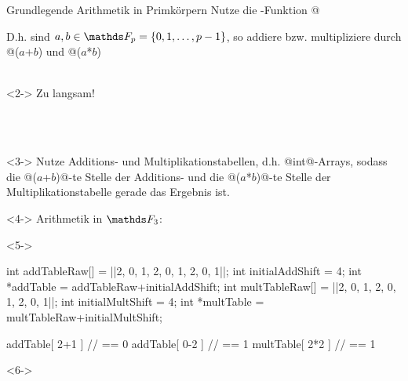 \documentclass{vorlage}
\begin{document}
\begin{frame}[fragile]{Grundlegende Arithmetik in Primkörpern}
   Nutze die \Clang-Funktion @%

  D.h. sind $a,b \in \F_p=\{0,1,\ldots,p-1\}$, so addiere bzw. multipliziere durch
  @($a$+$b$) %
  und 
  @($a$*$b$) %
  \\~\\

  \begin{uncoverenv}<2->
   Zu langsam!
  \end{uncoverenv}
  \\~\\
  \begin{uncoverenv}<3->
   Nutze Additions- und Multiplikationstabellen, d.h.
    @int@-Arrays, sodass die @($a$+$b$)@-te Stelle der Additions- und die 
    @($a$*$b$)@-te Stelle der Multiplikationstabelle gerade das Ergebnis ist.
  \end{uncoverenv}
  \begin{beispiel}<4->
    Arithmetik in $\F_3$:

    \begin{minipage}{0.65\textwidth}
    \begin{uncoverenv}<5->
    \begin{cexample}
int addTableRaw[] = ||{2, 0, 1, 2, 0, 1, 2, 0, 1}||;
int initialAddShift = 4;
int *addTable = addTableRaw+initialAddShift;
int multTableRaw[] = ||{2, 0, 1, 2, 0, 1, 2, 0, 1}||;
int initialMultShift = 4;
int *multTable = multTableRaw+initialMultShift;
    \end{cexample}
    \end{uncoverenv}
    \end{minipage}
    \begin{minipage}{0.3\textwidth}
    \begin{cexample}
addTable[ 2+1 ]
          // == 0 
addTable[ 0-2 ]
          // == 1
multTable[ 2*2 ]
          // == 1
    \end{cexample}
    \end{minipage}
    \begin{uncoverenv}<6->
    \end{uncoverenv}
  \end{beispiel}
\end{frame}
\end{document}
